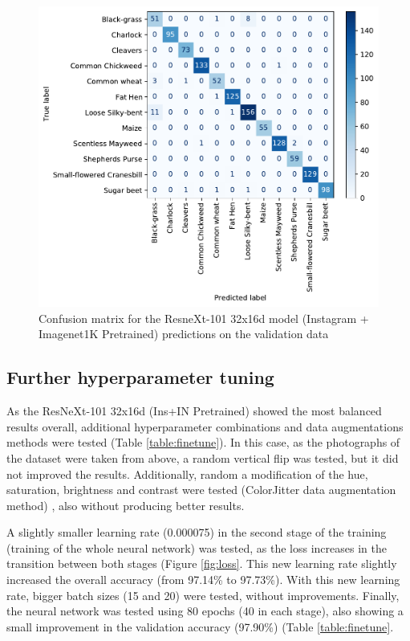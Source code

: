 \documentclass[11pt,onecolumn,titlepage,letterpaper]{article}
\begin{document}
\begin{figure}[h]
	\begin{center}
		\includegraphics[width=0.65\linewidth]{confusion_matrix.pdf}
	\end{center}
	\caption{Confusion matrix for the ResneXt-101 32x16d model (Instagram + Imagenet1K Pretrained) predictions on the validation data}
	\label{fig:cm}
\end{figure}

\subsection{Further hyperparameter tuning}

As the ResNeXt-101 32x16d (Ins+IN Pretrained) showed the most balanced results overall, additional hyperparameter combinations and data augmentations methods were tested (Table \ref{table:finetune}). In this case, as the photographs of the dataset were taken from above, a random vertical flip was tested, but it did not improved the results. Additionally, random a modification of the hue, saturation, brightness and contrast were tested (ColorJitter data augmentation method) \cite{Shorten2019}, also without producing better results.

A slightly smaller learning rate (0.000075) in the second stage of the training (training of the whole neural network) was tested, as the loss increases in the transition between both stages (Figure \ref{fig:loss}. This new learning rate slightly increased the overall accuracy (from 97.14\% to 97.73\%). With this new learning rate, bigger batch sizes (15 and 20) were tested, without improvements. Finally, the neural network was tested using 80 epochs (40 in each stage), also showing a small improvement in the validation accuracy (97.90\%) (Table \ref{table:finetune}.
\end{document}
